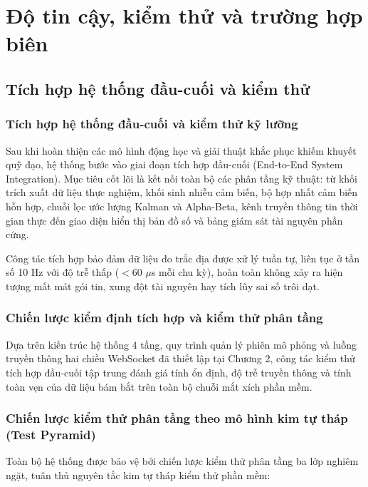 \section{Độ tin cậy, kiểm thử và trường hợp biên}

\subsection{Tích hợp hệ thống đầu-cuối và kiểm thử}

\subsubsection{Tích hợp hệ thống đầu-cuối và kiểm thử kỹ lưỡng}

\hspace{0.5cm} Sau khi hoàn thiện các mô hình động học và giải thuật khắc phục khiếm khuyết quỹ đạo, hệ thống bước vào giai đoạn tích hợp đầu-cuối (End-to-End System Integration). Mục tiêu cốt lõi là kết nối toàn bộ các phân tầng kỹ thuật: từ khối trích xuất dữ liệu thực nghiệm, khối sinh nhiễu cảm biến, bộ hợp nhất cảm biến hỗn hợp, chuỗi lọc ước lượng Kalman và Alpha-Beta, kênh truyền thông tin thời gian thực đến giao diện hiển thị bản đồ số và bảng giám sát tài nguyên phần cứng.

Công tác tích hợp bảo đảm dữ liệu đo trắc địa được xử lý tuần tự, liên tục ở tần số 10 Hz với độ trễ thấp ($< 60$ $\mu$s mỗi chu kỳ), hoàn toàn không xảy ra hiện tượng mất mát gói tin, xung đột tài nguyên hay tích lũy sai số trôi dạt.

\subsubsection{Chiến lược kiểm định tích hợp và kiểm thử phân tầng}

\hspace{0.5cm} Dựa trên kiến trúc hệ thống 4 tầng, quy trình quản lý phiên mô phỏng và luồng truyền thông hai chiều WebSocket đã thiết lập tại Chương 2, công tác kiểm thử tích hợp đầu-cuối tập trung đánh giá tính ổn định, độ trễ truyền thông và tính toàn vẹn của dữ liệu bám bắt trên toàn bộ chuỗi mắt xích phần mềm.


\subsubsection{Chiến lược kiểm thử phân tầng theo mô hình kim tự tháp (Test Pyramid)}

\hspace{0.5cm} Toàn bộ hệ thống được bảo vệ bởi chiến lược kiểm thử phân tầng ba lớp nghiêm ngặt, tuân thủ nguyên tắc kim tự tháp kiểm thử phần mềm:

